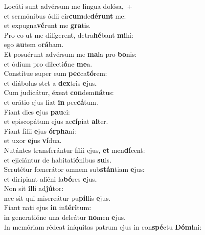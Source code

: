 \evenverse Locúti sunt advérsum me lingua dolósa,~+\\\evenverse  et sermónibus ódii cir\textbf{cum}de\textbf{dé}\textbf{runt} me:~\*\\
\evenverse et expugna\textbf{vé}runt me \textbf{gra}tis.\\
\oddverse Pro eo ut me dilígerent, detra\textbf{hé}bant \textbf{mi}hi:~\*\\
\oddverse ego \textbf{au}tem o\textbf{rá}bam.\\
\evenverse Et posuérunt advérsum me \textbf{ma}la pro \textbf{bo}nis:~\*\\
\evenverse et ódium pro dilecti\textbf{ó}ne \textbf{me}a.\\
\oddverse Constítue super eum \textbf{pec}ca\textbf{tó}rem:~\*\\
\oddverse et diábolus stet a \textbf{dex}tris \textbf{e}jus.\\
\evenverse Cum judicátur, éxeat \textbf{con}dem\textbf{ná}tus:~\*\\
\evenverse et orátio ejus fiat \textbf{in} pec\textbf{cá}tum.\\
\oddverse Fiant dies \textbf{e}jus \textbf{pau}ci:~\*\\
\oddverse et episcopátum ejus ac\textbf{cí}piat \textbf{al}ter.\\
\evenverse Fiant fílii \textbf{e}jus \textbf{ór}\textbf{pha}ni:~\*\\
\evenverse et uxor \textbf{e}jus \textbf{ví}dua.\\
\oddverse Nutántes transferántur fílii ejus, \textbf{et} men\textbf{dí}cent:~\*\\
\oddverse et ejiciántur de habitati\textbf{ó}nibus \textbf{su}is.\\
\evenverse Scrutétur fœnerátor omnem sub\textbf{stán}tiam \textbf{e}jus:~\*\\
\evenverse et dirípiant aliéni la\textbf{bó}res \textbf{e}jus.\\
\oddverse Non sit \textbf{il}li ad\textbf{jú}tor:~\*\\
\oddverse nec sit qui misereátur pu\textbf{píl}lis \textbf{e}jus.\\
\evenverse Fiant nati ejus \textbf{in} in\textbf{té}\textbf{ri}tum:~\*\\
\evenverse in generatióne una deleátur \textbf{no}men \textbf{e}jus.\\
\oddverse In memóriam rédeat iníquitas patrum ejus in con\textbf{spé}ctu \textbf{Dó}\textbf{mi}ni:~\*\\
